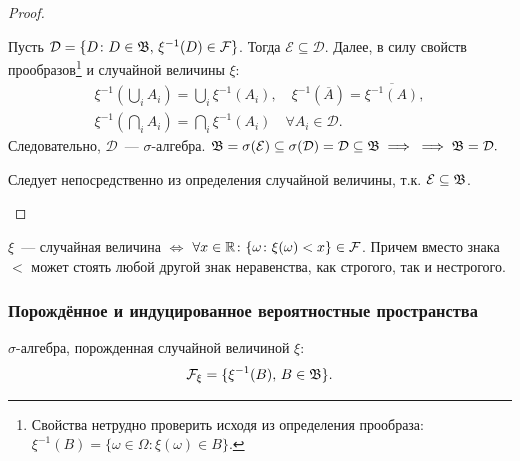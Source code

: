 \begin{proof}
    \begin{compactlist}
        \item[$\impliedby$] Пусть $\mathcal{D} = \{D \colon D \in \mathfrak{B}, \, \xi^{-1}(D) \in \mathcal{F} \}$. Тогда $\mathcal{E} \subseteq \mathcal{D}$. Далее, в силу свойств прообразов\footnote{Свойства нетрудно проверить исходя из определения прообраза: ${\xi^{-1}(B) = \{\omega \in \Omega \colon \xi(\omega) \in B\}}$.} и случайной величины $\xi$:
    \begin{gather*}
        \xi^{-1}\left(\bigcup\limits_i A_i\right) 
        = \bigcup\limits_i \xi^{-1}(A_i), \quad
        \xi^{-1}(\overline{A}) 
        = \overline{\xi^{-1}(A)}, \\
        \xi^{-1}\left(\bigcap\limits_i A_i\right) = \bigcap\limits_i \xi^{-1}(A_i) \quad \forall A_i \in \mathcal{D}.
    \end{gather*}
    Следовательно, $\mathcal{D}$~--- ${\sigma \text{-алгебра}}$. $\mathfrak{B} = \sigma(\mathcal{E}) \subseteq \sigma(\mathcal{D}) = \mathcal{D} \subseteq \mathfrak{B} \implies \\ \implies \mathfrak{B} = \mathcal{D}.$

    \item[$\implies$] Следует непосредственно из определения случайной величины, т.к. ${\mathcal{E} \subseteq \mathfrak{B}}$.
    \qedhere
    \end{compactlist}
\end{proof}

\begin{crlr}
    $\xi$~--- случайная величина $\iff$ $\forall x \in \mathbb{R} \colon \{\omega \colon \xi(\omega) < x \} \in \mathcal{F}$. 
    Причем вместо знака $<$ может стоять любой другой знак неравенства, как строгого, так и нестрогого.
\end{crlr}

\subsubsection{Порождённое и индуцированное вероятностные пространства}
\begin{defn}
    $\sigma\text{-алгебра}$, порожденная случайной величиной $\xi$:
    \begin{equation*}
        \mathcal{F}_\xi = \{\xi^{-1}(B), \, B \in \mathfrak{B} \}.
    \end{equation*}
\end{defn}


